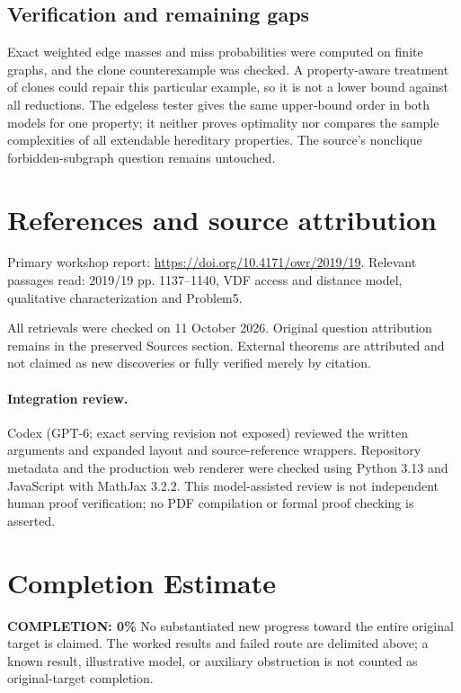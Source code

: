\documentclass[11pt]{article}
\begin{document}
\subsection{Verification and remaining gaps}
Exact weighted edge masses and miss probabilities were computed on finite graphs, and the clone counterexample was checked. A property-aware treatment of clones could repair this particular example, so it is not a lower bound against all reductions. The edgeless tester gives the same upper-bound order in both models for one property; it neither proves optimality nor compares the sample complexities of all extendable hereditary properties. The source's nonclique forbidden-subgraph question remains untouched.

\section{References and source attribution}
Primary workshop report: \url{https://doi.org/10.4171/owr/2019/19}. Relevant passages read: 2019/19 pp. 1137--1140, VDF access and distance model, qualitative characterization and Problem5.

All retrievals were checked on 11 October 2026. Original question attribution remains in the preserved Sources section. External theorems are attributed and not claimed as new discoveries or fully verified merely by citation.


\paragraph{Integration review.} Codex (GPT-6; exact serving revision not exposed) reviewed the written arguments and expanded layout and source-reference wrappers. Repository metadata and the production web renderer were checked using Python 3.13 and JavaScript with MathJax 3.2.2. This model-assisted review is not independent human proof verification; no PDF compilation or formal proof checking is asserted.

\section{Completion Estimate}
\noindent\textbf{COMPLETION: 0\%}
No substantiated new progress toward the entire original target is claimed. The worked results and failed route are delimited above; a known result, illustrative model, or auxiliary obstruction is not counted as original-target completion.
\end{document}
